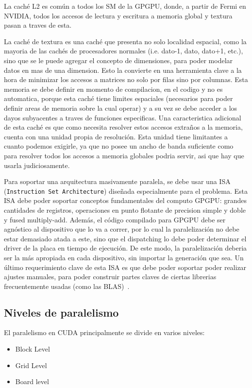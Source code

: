 La cach\'e L2 es com\'un a todos los SM de la GPGPU, donde, a partir de Fermi en NVIDIA, todos
los accesos de lectura y escritura a memoria global y textura pasan a traves de esta. ~\cite{NvidiaFermi}

La cach\'e de textura es una cach\'e que presenta no solo localidad espacial, como la mayoria
de las cach\'es de procesadores normales (i.e. dato-1, dato, dato+1, etc.), sino que se le
puede agregar el concepto de dimensiones, para poder modelar datos en mas de una dimension.
Esto la convierte en una herramienta clave a la hora de minimizar los accesos a matrices
no solo por filas sino por columnas. Esta memoria se debe definir en momento de compilacion,
en el codigo y no es automatica, porque esta cach\'e tiene limites espaciales (necesarios
para poder definir areas de memoria sobre la cual operar) y a su vez se debe acceder
a los dayos subyacentes a traves de funciones especificas. Una caracteristica adicional
de esta cach\'e es que como necesita resolver estos accesos extra\~nos a la memoria, cuenta
con una unidad propia de resoluci\'on. Esta unidad tiene limitantes a cuanto podemos
exigirle, ya que no posee un ancho de banda suficiente como para resolver todos los
accesos a memoria globales podria servir, asi que hay que usarla judiciosamente.

Para soportar una arquitectura masivamente paralela, se debe usar una ISA
(\texttt{Instruction Set Architecture}) dise\~nada especialmente para el problema. Esta ISA
debe poder soportar conceptos fundamentales del computo GPGPU: grandes cantidades de registros,
operaciones en punto flotante de precision simple y doble y fused multiply-add. Adem\'as,
el c\'odigo compilado para GPGPU debe ser agn\'ostico al dispositivo que lo va a correr, por
lo cual la paralelizaci\'on no debe estar demasiado atada a este, sino que el dispatching
lo debe poder determinar el driver de la placa en tiempo de ejecuci\'on. De este modo, la paralelizaci\'on
deberia ser la m\'as apropiada en cada dispositivo, sin importar la generaci\'on que sea. Un \'ultimo
requerimiento clave de esta ISA es que debe poder soportar poder realizar ajustes manuales,
para poder construir partes claves de ciertas librerias frecuentemente usadas (como las BLAS)~\cite{NvidiaFermi}.


\subsection{Niveles de paralelismo}
El paralelismo en CUDA principalmente se divide en varios niveles:
\begin{itemize}
  \item Block Level
  \item Grid Level
  \item Board level
\end{itemize}


